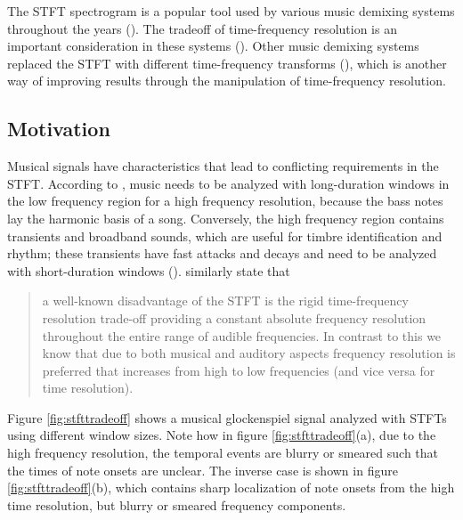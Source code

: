 \documentclass[report.tex]{subfiles}
\begin{document}
The STFT spectrogram is a popular tool used by various music demixing systems throughout the years (\cite{musicsepgood, musicsepsurvey, sisec2018, fitzgerald1, umx, plumbley1, plumbley2}). The tradeoff of time-frequency resolution is an important consideration in these systems (\cite{tftradeoff1, tftradeoff2}). Other music demixing systems replaced the STFT with different time-frequency transforms (\cite{fitzgerald2, cqtseparation, bettermusicsep}), which is another way of improving results through the manipulation of time-frequency resolution.

\subsection{Motivation}
\label{sec:motivation}

Musical signals have characteristics that lead to conflicting requirements in the STFT. According to \textcite{doerflerphd}, music needs to be analyzed with long-duration windows in the low frequency region for a high frequency resolution, because the bass notes lay the harmonic basis of a song. Conversely, the high frequency region contains transients and broadband sounds, which are useful for timbre identification and rhythm; these transients have fast attacks and decays and need to be analyzed with short-duration windows (\cite{doerflerphd}). \textcite{cqtransient} similarly state that

\begin{quote}
	a well-known disadvantage of the STFT is the rigid time-frequency resolution trade-off providing a constant absolute frequency resolution throughout the entire range of audible frequencies. In contrast to this we know that due to both musical and auditory aspects frequency resolution is preferred that increases from high to low frequencies (and vice versa for time resolution).
\end{quote}

Figure \ref{fig:stfttradeoff} shows a musical glockenspiel signal analyzed with STFTs using different window sizes. Note how in figure \ref{fig:stfttradeoff}(a), due to the high frequency resolution, the temporal events are blurry or smeared such that the times of note onsets are unclear. The inverse case is shown in figure \ref{fig:stfttradeoff}(b), which contains sharp localization of note onsets from the high time resolution, but blurry or smeared frequency components.
\end{document}
